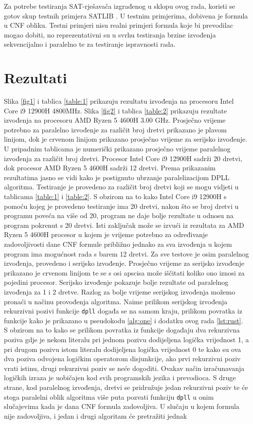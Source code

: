 \documentclass[hidelinks, conference]{IEEEtran}
\begin{document}
Za potrebe testiranja SAT-rješavača izgrađenog u sklopu ovog rada, koristi se gotov skup testnih primjera SATLIB \cite{b5}. U testnim primjerima, dobivena je formula u CNF obliku. Testni primjeri nisu realni primjeri formula koje bi prevodilac mogao dobiti, no reprezentativni su u svrhu testiranja brzine izvođenja sekvencijalno i paralelno te za testiranje ispravnosti rada.

\section{Rezultati}

Slika \ref{fig1} i tablica \ref{table:1} prikazuju rezultatu izvođenja na procesoru Intel Core i9 12900H 4800MHz. Slika \ref{fig2} i tablica \ref{table:2} prikazuju rezultate izvođenja na procesoru AMD Ryzen 5 4600H 3.00 GHz. Prosječno vrijeme potrebno za paralelno izvođenje za različit broj dretvi prikazano je plavom linijom, dok je crvenom linijom prikazano prosječno vrijeme za serijsko izvođenje. U pripadnim tablicama je numerički prikazano prosječno vrijeme paralelnog izvođenja za različit broj dretvi. Procesor Intel Core i9 12900H sadrži 20 dretvi, dok procesor AMD Ryzen 5 4600H sadrži 12 dretvi. Prema prikazanim rezultatima jasno se vidi kako je postignuto ubrzanje paralelizacijom DPLL algoritma. Testiranje je provedeno za različit broj dretvi koji se mogu vidjeti u tablicama \ref{table:1} i \ref{table:2}. S obzirom na to kako Intel Core i9 12900H s pomoću kojeg je provedeno testiranje ima 20 dretvi, nakon što se broj dretvi u programu poveća na više od 20, program ne daje bolje rezultate u odnosu na program pokrenut s 20 dretvi. Isti zaključak može se izvući iz rezultata za AMD Ryzen 5 4600H procesor u kojem je vrijeme potrebno za određivanje zadovoljivosti dane CNF formule približno jednako za sva izvođenja u kojem program ima mogućnost rada s barem 12 dretvi. Za sve testove je osim paralelnog izvođenja, provedeno i serijsko izvođenje. Prosječno vrijeme za serijsko izvođenje prikazano je crvenom linijom te se s osi apscisa može iščitati koliko ono iznosi za pojedini procesor. Serijsko izvođenje pokazuje bolje rezultate od paralelnog izvođenja za 1 i 2 dretve. Razlog za bolje vrijeme serijskog izvođenja možemo pronaći u načinu provođenja algoritma. Naime prilikom serijskog izvođenja rekurzivni pozivi funkcije \texttt{dpll} događa se na samom kraju, prilikom povratka iz funkcije kako je prikazano u pseudokodu \ref{alg:one} i dodatku ovog rada \ref{lst:rust}. S obzirom na to kako se prilikom povratka iz funkcije događaju dva rekurzivna poziva gdje je nekom literalu pri jednom pozivu dodijeljena logička vrijednost 1, a pri drugom pozivu istom literalu dodijeljena logička vrijednost 0 te kako su ova dva poziva odvojena logičkim operatorom disjunkcije, ako prvi rekurzivni poziv vrati istinu, drugi rekurzivni poziv se neće dogoditi. Ovakav način izračunavanja logičkih izraza je uobičajen kod svih programskih jezika i prevodioca. S druge strane, kod paralelnog izvođenja, dretvi se pridružuje jedan rekurzivni poziv te će stoga paralelni oblik algoritma više puta pozvati funkciju \texttt{dpll} u onim slučajevima kada je dana CNF formula zadovoljiva. U slučaju u kojem formula nije zadovoljiva, i jedan i drugi algoritam će pretražiti jednak 
\end{document}
